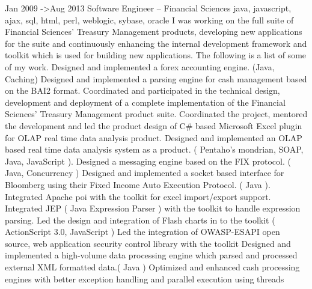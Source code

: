 Jan 2009 ->Aug 2013 Software Engineer – Financial Sciences
java, javascript, ajax, sql, html, perl, weblogic, sybase, oracle
I was working on the full suite of Financial Sciences' Treasury Management products, developing new applications for the suite and continuously enhancing the
internal development framework and toolkit which is used for building new applications. The following is a list of some of my work.
Designed and implemented a forex accounting engine. (Java, Caching)
Designed and implemented a parsing engine for cash management based on the BAI2 format.
Coordinated and participated in the technical design, development and deployment of a complete implementation of the Financial Sciences' Treasury
Management product suite.
Coordinated the project, mentored the development and led the product design of C\# based Microsoft Excel plugin for OLAP real time data analysis
product.
Designed and implemented an OLAP based real time data analysis system as a product. ( Pentaho's mondrian, SOAP, Java, JavaScript ).
Designed a messaging engine based on the FIX protocol. ( Java, Concurrency )
Designed and implemented a socket based interface for Bloomberg using their Fixed Income Auto Execution Protocol. ( Java ).
Integrated Apache poi with the toolkit for excel import/export support.
Integrated JEP ( Java Expression Parser ) with the toolkit to handle expression parsing.
Led the design and integration of Flash charts in to the toolkit ( ActionScript 3.0, JavaScript )
Led the integration of OWASP-ESAPI open source, web application security control library with the toolkit
Designed and implemented a high-volume data processing engine which parsed and processed external XML formatted data.( Java )
Optimized and enhanced cash processing engines with better exception handling and parallel execution using threads